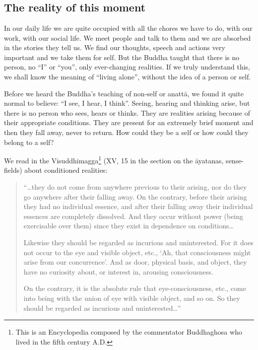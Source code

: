 \chapter[The reality of this moment]{}
\section*{The reality of this moment}

In our daily life we are quite occupied with all the chores we have to
do, with our work, with our social life. We meet people and talk to them
and we are absorbed in the stories they tell us. We find our thoughts,
speech and actions very important and we take them for self. But the
Buddha taught that there is no person, no ``I'' or ``you'', only
ever-changing realities. If we truly understand this, we shall know the
meaning of ``living alone'', without the idea of a person or self.

Before we heard the Buddha's teaching of non-self or anattā, we found it
quite normal to believe: ``I see, I hear, I think''. Seeing, hearing and
thinking arise, but there is no person who sees, hears or thinks. They
are realities arising because of their appropriate conditions. They are
present for an extremely brief moment and then they fall away, never to
return. How could they be a self or how could they belong to a self?

We read in the
Visuddhimagga\footnote{This is an Encyclopedia
composed by the commentator Buddhaghosa who lived in the fifth century
A.D.}  (XV, 15 in
the section on the āyatanas, sense-fields) about conditioned realities:

\begin{quote}
``\ldots{}they do not come from anywhere previous to their arising, nor
do they go anywhere after their falling away. On the contrary, before
their arising they had no individual essence, and after their falling
away their individual essences are completely dissolved. And they occur
without power (being exercisable over them) since they exist in
dependence on conditions\ldots{}

Likewise they should be regarded as incurious and uninterested. For it
does not occur to the eye and visible object, etc., `Ah, that
consciousness might arise from our concurrence'. And as door, physical
basis, and object, they have no curiosity about, or interest in,
arousing consciousness.

On the contrary, it is the absolute rule that eye-consciousness, etc.,
come into being with the union of eye with visible object, and so on. So
they should be regarded as incurious and uninterested\ldots{}''
\end{quote}

